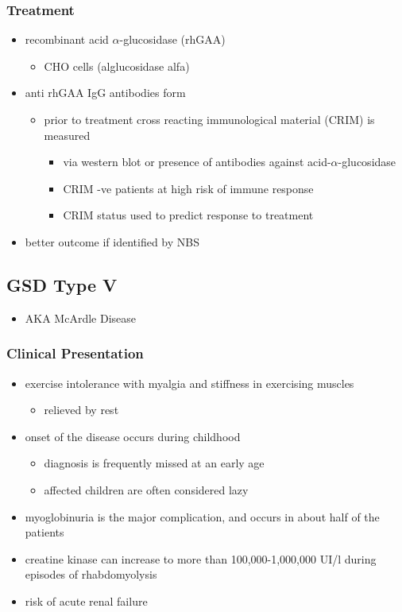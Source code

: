 \documentclass[12pt]{scrartcl}
\begin{document}
\subsubsection{Treatment}
\label{sec:org87c33bd}
\begin{itemize}
\item recombinant acid \(\alpha\)-glucosidase (rhGAA)
\begin{itemize}
\item CHO cells (alglucosidase alfa)
\end{itemize}
\item anti rhGAA IgG antibodies form
\begin{itemize}
\item prior to treatment cross reacting immunological material (CRIM) is measured
\begin{itemize}
\item via western blot or presence of antibodies against
acid-\(\alpha\)-glucosidase
\item CRIM -ve patients at high risk of immune response
\item CRIM status used to predict response to treatment
\end{itemize}
\end{itemize}
\item better outcome if identified by NBS
\end{itemize}

\subsection{GSD Type V}
\label{sec:org178415f}
\begin{itemize}
\item AKA McArdle Disease
\end{itemize}
\subsubsection{Clinical Presentation}
\label{sec:org1439537}
\begin{itemize}
\item exercise intolerance with myalgia and stiffness in exercising muscles
\begin{itemize}
\item relieved by rest
\end{itemize}
\item onset of the disease occurs during childhood
\begin{itemize}
\item diagnosis is frequently missed at an early age
\item affected children are often considered lazy
\end{itemize}
\item myoglobinuria is the major complication, and occurs in about half of
the patients
\item creatine kinase can increase to more than 100,000-1,000,000
UI/l during episodes of rhabdomyolysis
\item risk of acute renal failure
\end{itemize}
\end{document}
